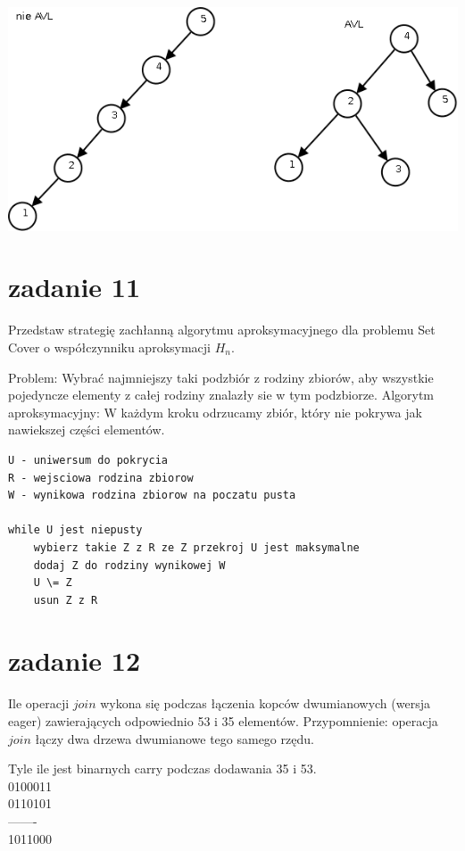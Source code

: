 \documentclass[svgnames]{report}
\begin{document}
  \includegraphics[width=16cm]{images/10.png}

\section{zadanie 11}
\begin{framed}
Przedstaw strategię zachłanną algorytmu aproksymacyjnego dla problemu Set Cover o współczynniku aproksymacji $H_n$.
\end{framed}
Problem: Wybrać najmniejszy taki podzbiór z rodziny zbiorów, aby wszystkie pojedyncze elementy z całej rodziny znalazły sie w tym podzbiorze.
Algorytm aproksymacyjny: W każdym kroku odrzucamy zbiór, który nie pokrywa jak nawiekszej części elementów.
\begin{lstlisting}
U - uniwersum do pokrycia
R - wejsciowa rodzina zbiorow
W - wynikowa rodzina zbiorow na poczatu pusta

while U jest niepusty
    wybierz takie Z z R ze Z przekroj U jest maksymalne
    dodaj Z do rodziny wynikowej W
    U \= Z
    usun Z z R
\end{lstlisting}

\section{zadanie 12}
\begin{framed}
Ile operacji $join$ wykona się podczas łączenia kopców dwumianowych (wersja eager) zawierających odpowiednio 53 i 35 elementów.
Przypomnienie: operacja $join$ łączy dwa drzewa dwumianowe tego samego rzędu.
\end{framed}

Tyle ile jest binarnych carry podczas dodawania 35 i 53.\\
0100011\\
0110101\\
——-\\
1011000
\end{document}
